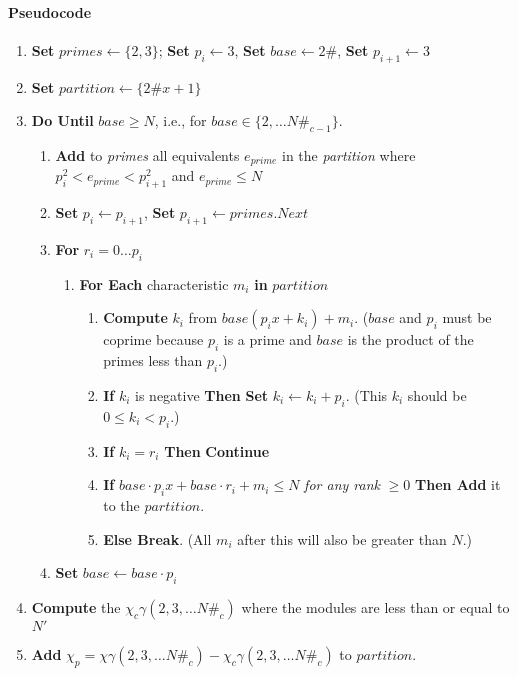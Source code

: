\documentclass{article}
\begin{document}
\paragraph{Pseudocode}
\begin{enumerate}
\item \textbf{Set} $primes \leftarrow \{ 2, 3 \}$; \textbf{Set} $p_i \leftarrow 3$, \textbf{Set} $base \leftarrow 2\#$, \textbf{Set} $p_{i+1} \leftarrow 3$
\item \textbf{Set} $partition \leftarrow \{ 2\#x+1 \}$
\item \textbf{Do Until} $base \geq N$, i.e., for $base \in \{ 2, \ldots N\#_{c-1} \}$.
	\begin{enumerate}
	\item  \textbf{Add} to \emph{primes} all equivalents $e_{prime}$ in the \emph{partition} where $p_i^2 < e_{prime} < p_{i+1}^2$ and $e_{prime} \leq N$
	\item \textbf{Set} $p_i \leftarrow p_{i+1}$, \textbf{Set} $p_{i+1} \leftarrow primes.Next$
	\item \textbf{For} $r_i = 0 \dots p_i$
		\begin{enumerate}
		\item \textbf{For Each} characteristic $m_i$ \textbf{in} $partition$
			\begin{enumerate}
			\item \textbf{Compute} $k_i$ from $base(p_ix+k_i)+m_i$. ($base$ and $p_i$ must be coprime because $p_i$ is a prime and $base$ is the product of the primes less than $p_i$.)
			\item \textbf{If} $k_i$ is negative \textbf{Then} \textbf{Set} $k_i \leftarrow k_i + p_i$. (This $k_i$ should be $0 \leq k_i < p_i$.)
			\item \textbf{If} $k_i = r_i$ \textbf{Then} \textbf{Continue}
			\item \textbf{If} $base \cdot p_i x + base \cdot r_i+m_i \leq N$ \emph{for any rank} $\geq 0$ \textbf{Then Add} it to the $partition$.
			\item \textbf{Else Break}. (All $m_i$ after this will also be greater than $N$.)
			\end{enumerate}
		\end{enumerate}
	\item \textbf{Set} $base \leftarrow base \cdot p_i$
	\end{enumerate}
\item \textbf{Compute} the $\chi_c \gamma(2, 3, \dots N\#_c)$ where the modules are less than or equal to $N'$
\item \textbf{Add} $\chi_p = \chi \gamma(2, 3, \dots N\#_c) - \chi_c \gamma(2, 3, \dots N\#_c)$ to $partition$.
\end{enumerate}
\end{document}
